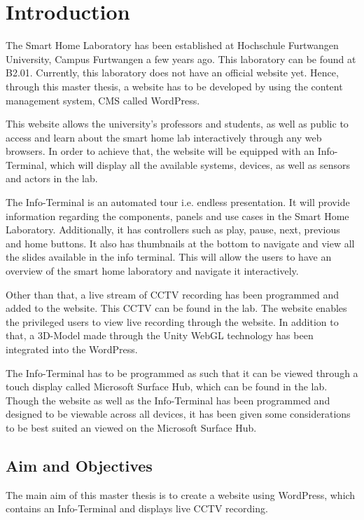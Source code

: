 \chapter{Introduction}

The Smart Home Laboratory has been established at Hochschule Furtwangen University, Campus Furtwangen a few years ago. This laboratory can be found at B2.01. Currently, this laboratory does not have an official website yet. Hence, through this master thesis, a website has to be developed by using the content management system, CMS called WordPress.

This website allows the university's professors and students, as well as public to access and learn about the smart home lab interactively through any web browsers. In order to achieve that, the website will be equipped with an Info-Terminal, which will display all the available systems, devices, as well as sensors and actors in the lab.

The Info-Terminal is an automated tour i.e. endless presentation. It will provide information regarding the components, panels and use cases in the Smart Home Laboratory. Additionally, it has controllers such as play, pause, next, previous and home buttons. It also has thumbnails at the bottom to navigate and view all the slides available in the info terminal. This will allow the users to have an overview of the smart home laboratory and navigate it interactively.

Other than that, a live stream of CCTV recording has been programmed and added to the website. This CCTV can be found in the lab. The website enables the privileged users to view live recording through the website. In addition to that, a 3D-Model made through the Unity WebGL technology has been integrated into the WordPress.

The Info-Terminal has to be programmed as such that it can be viewed through a touch display called Microsoft Surface Hub, which can be found in the lab. Though the website as well as the Info-Terminal has been programmed and designed to be viewable across all devices, it has been given some considerations to be best suited an viewed on the Microsoft Surface Hub.

\section{Aim and Objectives}
The main aim of this master thesis is to create a website using WordPress, which contains an Info-Terminal and displays live CCTV recording.

